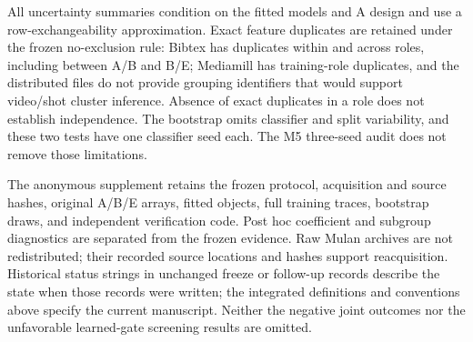 All uncertainty summaries condition on the fitted models and A design and use a row-exchangeability approximation. Exact feature duplicates are retained under the frozen no-exclusion rule: Bibtex has duplicates within and across roles, including between A/B and B/E; Mediamill has training-role duplicates, and the distributed files do not provide grouping identifiers that would support video/shot cluster inference. Absence of exact duplicates in a role does not establish independence. The bootstrap omits classifier and split variability, and these two tests have one classifier seed each. The M5 three-seed audit does not remove those limitations.

The anonymous supplement retains the frozen protocol, acquisition and source hashes, original A/B/E arrays, fitted objects, full training traces, bootstrap draws, and independent verification code. Post hoc coefficient and subgroup diagnostics are separated from the frozen evidence. Raw Mulan archives are not redistributed; their recorded source locations and hashes support reacquisition. Historical status strings in unchanged freeze or follow-up records describe the state when those records were written; the integrated definitions and conventions above specify the current manuscript. Neither the negative joint outcomes nor the unfavorable learned-gate screening results are omitted.
